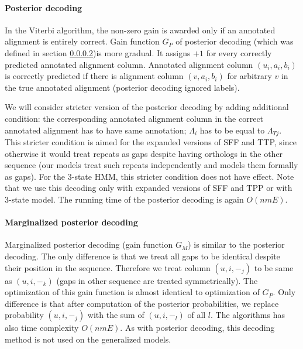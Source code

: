 \paragraph{Posterior decoding}
In the Viterbi algorithm, the non-zero gain is awarded only if an annotated
alignment is entirely correct. Gain function $G_P$ of posterior decoding (which
was defined in section \ref{})is more gradual. It assigns $+1$ for every
correctly predicted annotated alignment column. Annotated alignment column
$(u_i, a_i, b_i)$ is correctly predicted if there is alignment column $(v, a_i,
b_i)$ for arbitrary $v$ in the true annotated alignment (posterior decoding
ignored labels). 

We will consider stricter version of the posterior decoding by adding
additional condition: the corresponding annotated alignment column in the
correct annotated alignment has to have same annotation; $\Lambda_i$ has to be
equal to $\Lambda_{Tj}$. This stricter condition is aimed for the expanded
versions of SFF and TTP, since otherwise it would treat repeats as gaps despite
having orthologs in the other sequence (our models treat such repeats
independently and models them formally as gaps).  For the 3-state HMM, this
stricter condition does not have effect. Note that we use this decoding only
with expanded versions of SFF and TPP or with 3-state model.  The running time
of the posterior decoding is again $O(nmE)$.

\paragraph{Marginalized posterior decoding}

Marginalized posterior decoding (gain function $G_M$) is similar to the
posterior decoding. The only difference is that we treat all gaps to be
identical despite their position in the sequence. Therefore we treat column
$(u, i, -_j)$ to be same as $(u, i, -_k)$ (gaps in other sequence are treated
symmetrically). The optimization of this gain function is almost identical to
optimization of $G_P$. Only difference is that after computation of the
posterior probabilities, we replace probability $(u, i, -_j)$ with the sum of
$(u, i, -_l)$ of all $l$. The algorithms has also time complexity $O(nmE)$.  As
with posterior decoding, this decoding method is not used on the generalized
models.

